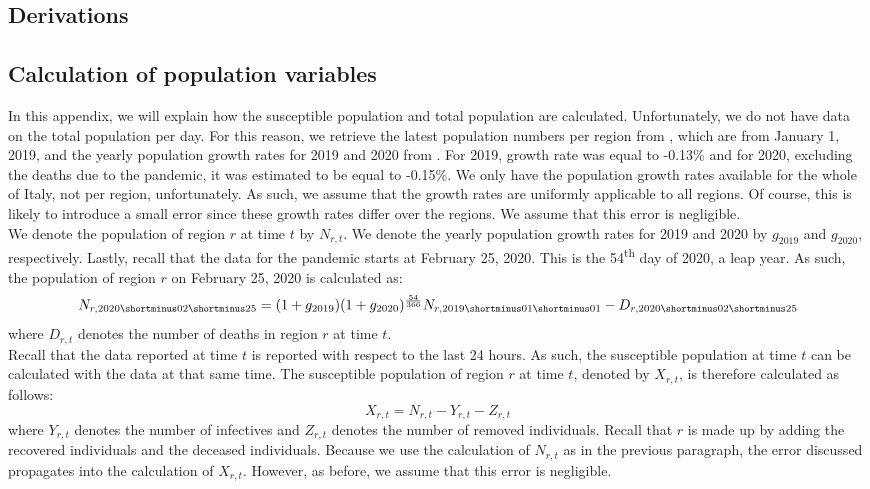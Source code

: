 \documentclass[12pt]{article}
\begin{document}
\begin{appendices}
		\newpage
		\section{Derivations} \label{app:derivations}
		
		\subsection{Calculation of population variables}\label{sapp:derivation_population_variables}
		In this appendix, we will explain how the susceptible population and total population are calculated. Unfortunately, we do not have data on the total population per day. For this reason, we retrieve the latest population numbers per region from \textcite{eurostatDatabase}, which are from January 1, 2019, and the yearly population growth rates for 2019 and 2020 from \textcite{worldometer2020italypopulation}. For 2019, growth rate was equal to -0.13\% and for 2020, excluding the deaths due to the pandemic, it was estimated to be equal to -0.15\%. We only have the population growth rates available for the whole of Italy, not per region, unfortunately. As such, we assume that the growth rates are uniformly applicable to all regions. Of course, this is likely to introduce a small error since these growth rates differ over the regions. We assume that this error is negligible. \\
		
		We denote the population of region $r$ at time $t$ by $N_{r,t}$. We denote the yearly population growth rates for 2019 and 2020 by $g_{2019}$ and $g_{2020}$, respectively. Lastly, recall that the data for the pandemic starts at February 25, 2020. This is the 54\textsuperscript{th} day of 2020, a leap year. As such, the population of region $r$ on February 25, 2020 is calculated as:
		\begin{equation}\label{eq:calc_total_population}
		    N_{r, 2020\shortminus02\shortminus25} = (1+g_{2019})(1+g_{2020})^{\frac{54}{366}}N_{r, 2019\shortminus01\shortminus01} - D_{r, 2020\shortminus02\shortminus25}
		\end{equation}
		where $D_{r,t}$ denotes the number of deaths in region $r$ at time $t$. \\
		
		Recall that the data reported at time $t$ is reported with respect to the last 24 hours. As such, the susceptible population at time $t$ can be calculated with the data at that same time. The susceptible population of region $r$ at time $t$, denoted by $X_{r,t}$, is therefore calculated as follows:
		\begin{equation}\label{eq:calc_susceptible_population}
		    X_{r,t} = N_{r,t} - Y_{r,t} - Z_{r,t}
		\end{equation}
		where $Y_{r,t}$ denotes the number of infectives and $Z_{r,t}$ denotes the number of removed individuals. Recall that $r$ is made up by adding the recovered individuals and the deceased individuals. Because we use the calculation of $N_{r,t}$ as in the previous paragraph, the error discussed propagates into the calculation of $X_{r,t}$. However, as before, we assume that this error is negligible.
		

\end{appendices}
\end{document}
